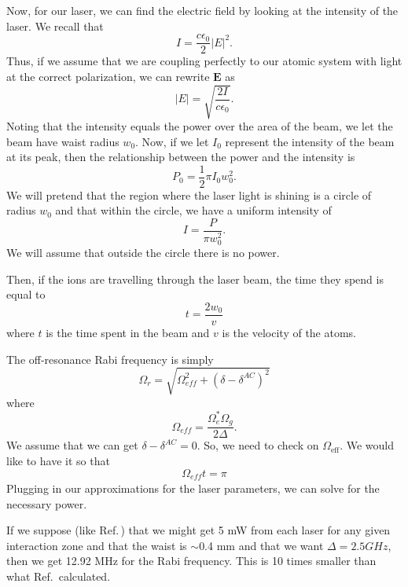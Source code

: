 Now, for our laser, we can find the electric field by looking at the intensity of the laser. We recall that 
\begin{equation}
I=\frac{c\epsilon_0}{2}|E|^2.
\end{equation}
Thus, if we assume that we are coupling perfectly to our atomic system with light at the correct polarization, we can rewrite $\mathbf{E}$ as 
\begin{equation}
|E|=\sqrt{\frac{2I}{c\epsilon_0}}.
\end{equation}
Noting that the intensity equals the power over the area of the beam, we let the beam have waist radius $w_0$. Now, if we let $I_0$ represent the intensity of the beam at its peak, then the relationship between the power and the intensity is 
\begin{equation}
P_0=\frac{1}{2}\pi I_0 w_0^2. 
\end{equation}
We will pretend that the region where the laser light is shining is a circle of radius $w_0$ and that within the circle, we have a uniform intensity of 
\begin{equation}
I=\frac{P}{\pi w_0^2}.
\end{equation}
We will assume that outside the circle there is no power. 

Then, if the ions are travelling through the laser beam, the time they spend is equal to 
\begin{equation}
t=\frac{2 w_0}{v}
\end{equation}
where $t$ is the time spent in the beam and $v$ is the velocity of the atoms. 

The off-resonance Rabi frequency is simply \cite{Young1997363}
\begin{equation}
\Omega_r=\sqrt{\Omega_{\mathit{eff}}^2+(\delta-\delta^{AC})^2}
\end{equation}
where 
\begin{equation}
\Omega_{\mathit{eff}}=\frac{\Omega_e^*\Omega_g}{2\Delta}.
\end{equation}
We assume that we can get $\delta-\delta^{AC}=0$. So, we need to check on $\Omega_{\mathrm{eff}}$. We would like to have it so that 
\begin{equation}
\Omega_{\mathit{eff}}t=\pi
\end{equation}
Plugging in our approximations for the laser parameters, we can solve for the necessary power. 

If we suppose (like Ref.\,\cite{cjeDiss}) that we might get 5 mW from each laser for any given interaction zone and that the waist is $\sim$0.4 mm and that we want $\Delta= 2.5 GHz$, then we get 12.92 MHz for the Rabi frequency. This is 10 times smaller than what Ref.\,\cite{cjeDiss} calculated. 

